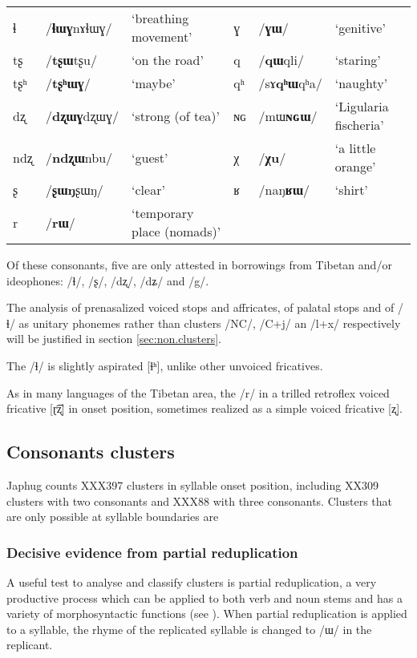 \documentclass[oldfontcommands,oneside,a4paper,11pt]{article}
\newcommand{\ipa}[1]{/#1/} %
\begin{document}
\begin{table}
{\begin{tabular}{lll|lll}
ɬ   & 	  \ipa{\textbf{ɬɯɣ}nɤɬɯɣ}   & 	 `breathing movement' & 	ɣ & 	\ipa{\textbf{ɣɯ}}   & 	 `genitive' \\ 
tʂ   & 	  \ipa{\textbf{tʂɯ}tʂu}   & 	 `on the road' & 	q & 	\ipa{\textbf{qɯ}qli}   & 	 `staring' \\ 
tʂʰ   & 	  \ipa{\textbf{tʂʰɯɣ}}   & 	 `maybe' & 	qʰ & 	\ipa{sɤ\textbf{qʰɯ}qʰa}   & 	 `naughty' \\ 
dʐ   & 	\ipa{\textbf{dʐɯɣ}dʐɯɣ}   & 	 `strong (of tea)' & 	ɴɢ & 	\ipa{mɯ\textbf{ɴɢɯ}}  & 	 `Ligularia fischeria' \\ 
ndʐ & 	\ipa{\textbf{ndʐɯ}nbu}   & 	 `guest' & 	χ & 	\ipa{\textbf{χu}}   & 	 `a little orange' \\ 
ʂ & 	\ipa{\textbf{ʂɯŋ}ʂɯŋ}   & 	 `clear' & 	ʁ & 	\ipa{naŋ\textbf{ʁɯ}}   & 	 `shirt' \\ 
r & 	\ipa{\textbf{rɯ}}   & 	 `temporary place (nomads)' & 	  & 	 & 	 \\ 
\bottomrule
\end{tabular}}
\end{table}

Of these consonants, five are only attested in borrowings from Tibetan and/or ideophones: /ɬ/, /ʂ/, /dʐ/, /dʑ/ and /g/.

The analysis of prenasalized voiced stops and affricates, of palatal stops and of /ɬ/ as unitary phonemes rather than clusters /NC/, /C+j/ an /l+x/ respectively will be justified in section \ref{sec:non.clusters}. 

The /ɬ/ is slightly aspirated [ɬʰ], unlike other unvoiced fricatives.


As in many languages of the Tibetan area, the /r/ in a trilled retroflex voiced fricative [ɽ͡ʐ] in onset position, sometimes realized as a simple voiced fricative [ʐ].


  \subsection{Consonants clusters} \label{sec:clusters}
  Japhug counts XXX397 clusters in syllable onset position, including  XX309 clusters with two consonants and XXX88 with three consonants. Clusters that are only possible at syllable boundaries are
  
  \subsubsection{Decisive evidence from partial reduplication} \label{sec:redp}
 A useful test to analyse and classify clusters is partial reduplication, a very productive process which can be applied to both verb and noun stems and has a variety of morphosyntactic functions (see \citealt{jacques07redupl}). When partial reduplication is applied to a syllable, the rhyme of the replicated syllable is changed to \ipa{ɯ} in the replicant.
 
\end{document}
